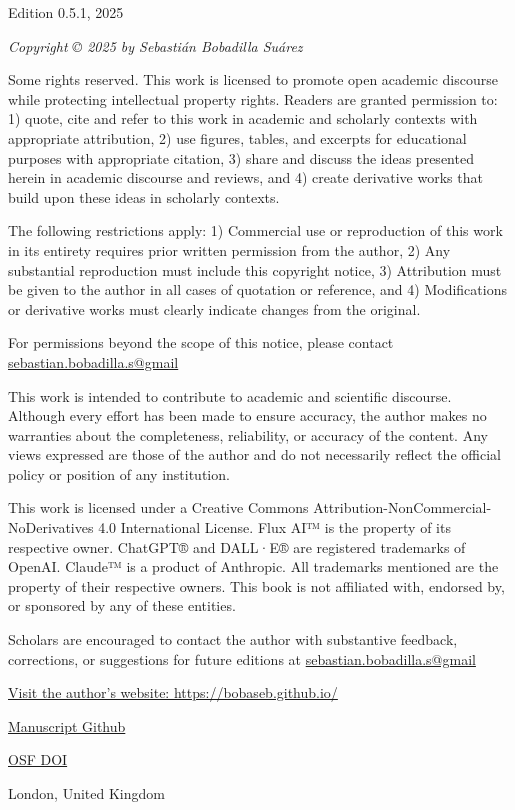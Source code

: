 \thispagestyle{empty}
\begin{center}
  \vspace*{\fill}
  Edition 0.5.1, 2025

  \textit{Copyright © 2025 by Sebastián Bobadilla Suárez}

  Some rights reserved. This work is licensed to promote open academic discourse while protecting intellectual property rights. Readers are granted permission to: 1) quote, cite and refer to this work in academic and scholarly contexts with appropriate attribution, 2) use figures, tables, and excerpts for educational purposes with appropriate citation, 3) share and discuss the ideas presented herein in academic discourse and reviews, and 4) create derivative works that build upon these ideas in scholarly contexts.

  The following restrictions apply: 1) Commercial use or reproduction of this work in its entirety requires prior written permission from the author, 2) Any substantial reproduction must include this copyright notice, 3) Attribution must be given to the author in all cases of quotation or reference, and 4) Modifications or derivative works must clearly indicate changes from the original.

  For permissions beyond the scope of this notice, please contact \href{mailto:sebastian.bobadilla.s@gmail.com}{sebastian.bobadilla.s@gmail}

  This work is intended to contribute to academic and scientific discourse. Although every effort has been made to ensure accuracy, the author makes no warranties about the completeness, reliability, or accuracy of the content. Any views expressed are those of the author and do not necessarily reflect the official policy or position of any institution.

  This work is licensed under a Creative Commons Attribution-NonCommercial-NoDerivatives 4.0 International License. Flux AI™ is the property of its respective owner. ChatGPT® and DALL·E® are registered trademarks of OpenAI. Claude™ is a product of Anthropic. All trademarks mentioned are the property of their respective owners. This book is not affiliated with, endorsed by, or sponsored by any of these entities.

  Scholars are encouraged to contact the author with substantive feedback, corrections, or suggestions for future editions at \href{mailto:sebastian.bobadilla.s@gmail.com}{sebastian.bobadilla.s@gmail}

  \href{https://bobaseb.github.io/}{Visit the author's website: https://bobaseb.github.io/}

  \href{https://github.com/bobaseb/energetically-coherent-computation}{Manuscript Github}

  \href{https://doi.org/10.17605/OSF.IO/42GXN}{OSF DOI}

  London, United Kingdom
  \vspace*{\fill}
\end{center}